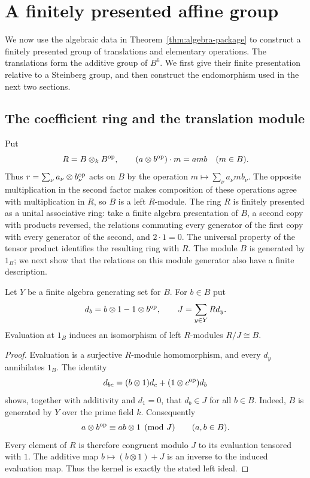 \section{A finitely presented affine group}\label{sec:affine}

We now use the algebraic data in Theorem~\ref{thm:algebra-package} to
construct a finitely presented group of translations and elementary
operations.  The translations form the additive group of $B^6$.
We first give their finite presentation relative to a Steinberg group,
and then construct the endomorphism used in the next two sections.

\subsection{The coefficient ring and the translation module}

Put
\[
 R=B\otimes_k B^{\mathrm{op}},
 \qquad (a\otimes b^{\mathrm{op}})\cdot m=amb\quad(m\in B).
\]
Thus $r=\sum_\nu a_\nu\otimes b_\nu^{\mathrm{op}}$ acts on $B$ by the
operation $m\mapsto\sum_\nu a_\nu m b_\nu$. The opposite multiplication
in the second factor makes composition of these operations agree with
multiplication in $R$, so $B$ is a left $R$-module.
The ring $R$ is finitely presented
as a unital associative ring: take a finite algebra presentation of
$B$, a second copy with products reversed, the relations commuting
every generator of the first copy with every generator of the second,
and $2\cdot1=0$.  The universal property of the tensor product
identifies the resulting ring with $R$.
The module $B$ is generated by $1_B$; we next show that the relations
on this module generator also have a finite description.

\begin{lemma}\label{lem:cyclic-module}
Let $Y$ be a finite algebra generating set for $B$.  For $b\in B$ put
\[
 d_b=b\otimes1-1\otimes b^{\mathrm{op}},
 \qquad J=\sum_{y\in Y}R d_y.
\]
Evaluation at $1_B$ induces an isomorphism of left $R$-modules
$R/J\cong B$.
\end{lemma}

\begin{proof}
Evaluation is a surjective $R$-module homomorphism, and every $d_y$
annihilates $1_B$.  The identity
\begin{equation}\label{eq:module-product}
 d_{bc}=(b\otimes1)d_c+(1\otimes c^{\mathrm{op}})d_b
\end{equation}
shows, together with additivity and $d_1=0$, that $d_b\in J$ for all
$b\in B$.  Indeed, $B$ is generated by $Y$ over the prime field $k$.
Consequently
\[
 a\otimes b^{\mathrm{op}}\equiv ab\otimes1\pmod J
 \qquad(a,b\in B).
\]
Every element of $R$ is therefore congruent modulo $J$ to its
evaluation tensored with $1$.  The additive map
$b\mapsto(b\otimes1)+J$ is an inverse to the induced evaluation map.
Thus the kernel is exactly the stated left ideal.
\end{proof}

